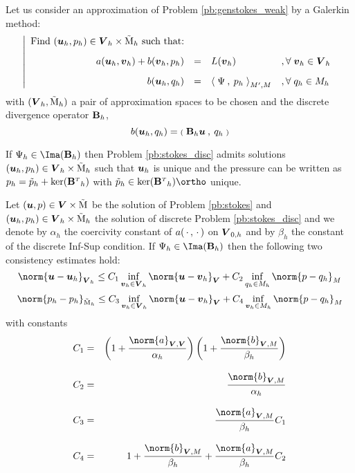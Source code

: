 Let us consider an approximation of Problem \ref{pb:genstokes_weak} by a Galerkin method:
\begin{equation*}\label{pb:stokes_disc}
\left\vert
\begin{array}{rlll}
\mbox{Find $({\boldsymbol u}_h,p_h)\in \boldsymbol{{V}}_h\times{\mathrm{\tilde M}_h}$ such that:}\\[2ex]
\displaystyle a({\boldsymbol u}_h,{\boldsymbol v}_h) + b({\boldsymbol v}_h, p_h) &=& L({{\boldsymbol v}}_h)& ,{\forall\;}{{\boldsymbol v}}_h\in\boldsymbol{{V}}_h\\[2ex]
\displaystyle b({\boldsymbol u}_h,q_h) &=& \mathbf{\langle}\;\Psi\:,\: p_h \;\mathbf{\rangle}_{{M}',{M}} & ,{\forall\;} q_h\in{{M}}_h
\end{array}
\right.
\end{equation*}
with $(\boldsymbol{{V}}_h,{\mathrm{\tilde M}_h})$ a pair of approximation spaces to be chosen and the discrete divergence operator ${\mathbf B}_h$,
\begin{equation*}
b({\boldsymbol u}_h,q_h) = {{\scriptstyle\mathbf{(}}\;{\mathbf B}_h{{\boldsymbol u}}\:,\: q_h \;{\scriptstyle\mathbf{)}}}
\end{equation*}

\begin{thrm}
If $\Psi_h \in \Ima(\tB_h)$ then Problem \eqref{pb:stokes_disc} admits solutions $({\boldsymbol u}_h,p_h)\in\boldsymbol{{V}}_h\times{\mathrm{\tilde M}_h}$ such that ${\boldsymbol u}_h$ is unique and the pressure can be written as $p_h = \tilde p_h + \ker(\tB\trans_h)$ with $\tilde p_h \in \ker(\tB\trans_h)\ortho$ unique.
\end{thrm}

\begin{thrm}
Let $({{\boldsymbol u}},p)\in\boldsymbol{{V}}\times{\mathrm{\tilde M}}$ be the solution of Problem \eqref{pb:stokes} and $({\boldsymbol u}_h,p_h)\in\boldsymbol{{V}}_h\times{\mathrm{\tilde M}_h}$  the solution of discrete Problem \eqref{pb:stokes_disc} and we denote by $\alpha_h$ the coercivity constant of $a(\,{\mathbf\cdot}\,,\,{\mathbf\cdot}\,)$ on $\boldsymbol{{V}}_{0,h}$ and by $\beta_h$ the constant of the discrete Inf-Sup condition.
If $\Psi_h \in \Ima(\tB_h)$ then the following two consistency estimates hold:
\begin{equation*}
\norm{\uu - \uuh}_{\xVhd} \leq C_1 \inf_{\vvh\in\xVhd}\norm{\uu - \vvh}_{\xVd} + C_2 \inf_{q_h\in\xMh}\norm{p - q_h}_{\xM}
\end{equation*}
\begin{equation*}
\norm{p_h - p_h}_{\xMzh} \leq C_3 \inf_{\vvh\in\xVhd}\norm{\uu - \vvh}_{\xVd} + C_4 \inf_{\vvh\in\xMh}\norm{p - q_h}_{\xM}
\end{equation*}
with constants
\begin{eqnarray*}
C_1 &=& \Grp{ 1 + \dfrac{\norm{a}_{\xVd,\xVd}}{\alpha_h}}\Grp{ 1 + \dfrac{\norm{b}_{\xVd,\xM}}{\beta_h} } \\[2ex]
C_2 &=& \dfrac{\norm{b}_{\xVd,\xM}}{\alpha_h}\\[2ex]
C_3 &=& \dfrac{\norm{a}_{\xVd,\xM}}{\beta_h} C_1 \\[2ex]
C_4 &=& 1 + \dfrac{\norm{b}_{\xVd,\xM}}{\beta_h} + \dfrac{\norm{a}_{\xVd,\xM}}{\beta_h} C_2 \\[2ex]
\end{eqnarray*}
\end{thrm}

